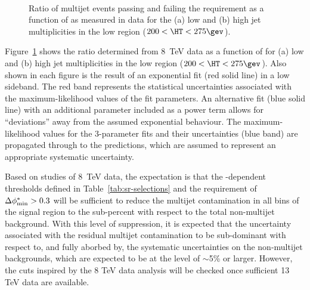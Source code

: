\begin{figure}[!h]
  \centering
   \\
  \caption{Ratio of multijet events passing and failing the \mhtmet
    requirement as a function of \alphat as measured in data for the
    (a) low and (b) high jet multiplicities in
    the low \HT region ($200 < \HT < 275\gev$). }
  \label{fig:qcd-ratio-data}
\end{figure}

Figure~\ref{fig:qcd-ratio-data} shows the ratio \rmhtmet determined
from 8~TeV data as a function of \alphat for (a) low and (b) high jet
multiplicities in the low \HT region ($200 < \HT < 275\gev$).  Also
shown in each figure is the result of an exponential fit (red solid
line) in a low \alphat sideband. The red band represents the
statistical uncertainties associated with the maximum-likelihood
values of the fit parameters. An alternative fit (blue solid line)
with an additional parameter included as a power term allows for
``deviations'' away from the assumed exponential behaviour. The
maximum-likelihood values for the 3-parameter fits and their
uncertainties (blue band) are propagated through to the predictions,
which are assumed to represent an appropriate systematic uncertainty.

Based on studies of 8~TeV data, the expectation is that the
\HT-dependent \alphat thresholds defined in
Table~\ref{tab:sr-selections} and the requirement of $\bdphi > 0.3$
will be sufficient to reduce the multijet contamination in all bins of
the signal region to the sub-percent with respect to the total
non-multijet background. With this level of suppression, it is
expected that the uncertainty associated with the residual multijet
contamination to be sub-dominant with respect to, and fully aborbed
by, the systematic uncertainties on the non-multijet backgrounds,
which are expected to be at the level of $\sim$5\% or larger. 
However, the cuts inspired by the 8 TeV data analysis will be checked
once sufficient 13 TeV data are available.
